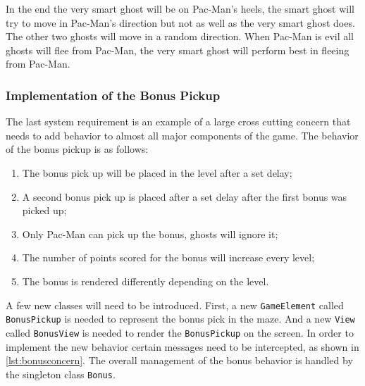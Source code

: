In the end the very smart ghost will be on Pac-Man's heels, the smart ghost will try to move in Pac-Man's direction but not as well as the very smart ghost does. The other two ghosts will move in a random direction. When Pac-Man is evil all ghosts will flee from Pac-Man, the very smart ghost will perform best in fleeing from Pac-Man.

\subsubsection{Implementation of the Bonus Pickup}

The last system requirement is an example of a large cross cutting concern that needs to add behavior to almost all major components of the game.
The behavior of the bonus pickup is as follows:
\begin{enumerate}[noitemsep]
	\samepage
	\item The bonus pick up will be placed in the level after a set delay;
	\item A second bonus pick up is placed after a set delay after the first bonus was picked up;	
	\item Only Pac-Man can pick up the bonus, ghosts will ignore it;
	\item The number of points scored for the bonus will increase every level;
	\item The bonus is rendered differently depending on the level.
\end{enumerate}

A few new classes will need to be introduced. First, a new \lstinline|GameElement| called \lstinline|BonusPickup| is needed to represent the bonus pick in the maze. And a new \lstinline|View| called \lstinline|BonusView| is needed to render the \lstinline|BonusPickup| on the screen.
In order to implement the new behavior certain messages need to be intercepted, as shown in \autoref{lst:bonusconcern}. The overall management of the bonus behavior is handled by the singleton class \lstinline|Bonus|.

